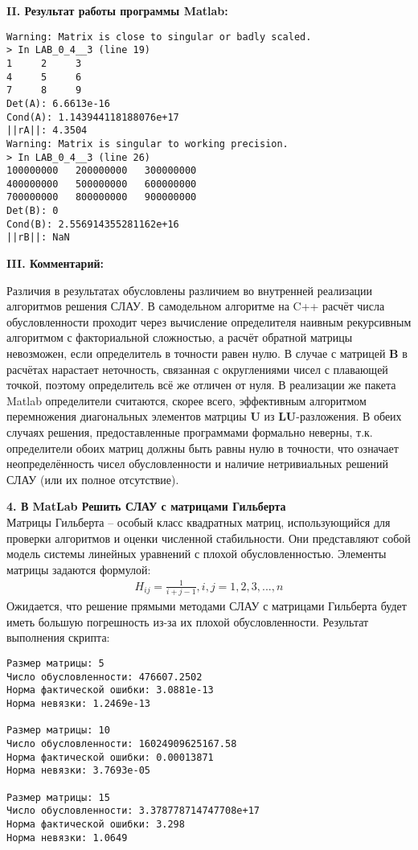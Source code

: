 \documentclass[a4paper]{article}
\begin{document}
\newpage
{\large\bf II. Результат работы программы Matlab:}
\begin{multicols}{2}
{\singlespacing
\begin{verbatim}
Warning: Matrix is close to singular or badly scaled.
> In LAB_0_4__3 (line 19)
1     2     3
4     5     6
7     8     9
Det(A): 6.6613e-16
Cond(A): 1.143944118188076e+17
||rA||: 4.3504
Warning: Matrix is singular to working precision.
> In LAB_0_4__3 (line 26)
100000000   200000000   300000000
400000000   500000000   600000000
700000000   800000000   900000000
Det(B): 0
Cond(B): 2.556914355281162e+16
||rB||: NaN
\end{verbatim}}
\end{multicols}
{\large\bf III. Комментарий:}
\begin{multicols}{2}
Различия в результатах обусловлены различием во внутренней реализации алгоритмов решения СЛАУ. В самодельном алгоритме на C++ расчёт числа обусловленности проходит через вычисление определителя наивным рекурсивным алгоритмом с факториальной сложностью, а расчёт обратной матрицы невозможен, если определитель в точности равен нулю. В случае с матрицей $\mathbf{B}$ в расчётах нарастает неточность, связанная с округлениями чисел с плавающей точкой, поэтому определитель всё же отличен от нуля. В реализации же пакета Matlab определители считаются, скорее всего, эффективным алгоритмом перемножения диагональных элементов матрциы $\mathbf{U}$ из $\mathbf{LU}$-разложения. В обеих случаях решения, предоставленные программами формально неверны, т.к. определители обоих матриц должны быть равны нулю в точности, что означает неопределённость чисел обусловленности и наличие нетривиальных решений СЛАУ (или их полное отсутствие).
\end{multicols}
{\Large{\textbf{4. В MatLab Решить СЛАУ с матрицами Гильберта}}}\\
Матрицы Гильберта -- особый класс квадратных матриц, использующийся для проверки алгоритмов и оценки численной стабильности. Они представляют собой модель системы линейных уравнений с плохой обусловленностью. Элементы матрицы задаются формулой:
\begin{align}
    H_{ij}={\frac {1}{i+j-1}},i,j=1,2,3,...,n
\end{align}
Ожидается, что решение прямыми методами СЛАУ с матрицами Гильберта будет иметь большую погрешность из-за их плохой обусловленности. Результат выполнения скрипта:
{\singlespacing\begin{verbatim}
Размер матрицы: 5
Число обусловленности: 476607.2502
Норма фактической ошибки: 3.0881e-13
Норма невязки: 1.2469e-13

Размер матрицы: 10
Число обусловленности: 16024909625167.58
Норма фактической ошибки: 0.00013871
Норма невязки: 3.7693e-05

Размер матрицы: 15
Число обусловленности: 3.378778714747708e+17
Норма фактической ошибки: 3.298
Норма невязки: 1.0649
\end{verbatim}}
\end{document}
